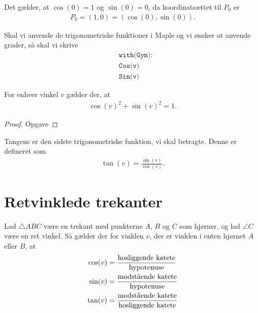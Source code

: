 \begin{exa}
Det gælder, at $\cos(0) = 1$ og $\sin(0)=0$, da koordinatsættet til $P_0$ er 
\begin{align*}
P_0 = (1,0) = (\cos(0),\sin(0)).
\end{align*}
\end{exa}

Skal vi anvende de trigonometriske funktioner i Maple og vi ønsker at anvende grader, så skal vi skrive
\begin{align*}
	&\texttt{with(Gym):} \\
	&\texttt{Cos(v)} \\	
	&\texttt{Sin(v)}
\end{align*}

\begin{setn}[Idiotformlen]
For enhver vinkel $v$ gælder der, at 
\begin{align*}
 \cos(v)^2 + \sin(v)^2 = 1.
\end{align*}
\end{setn}
\begin{proof}
Opgave
\end{proof}

Tangens er den sidste trigonometriske funktion, vi skal betragte. Denne er defineret som 
\begin{align*}
\tan(v) = \frac{\sin(v)}{\cos(v)}.
\end{align*}

\newpage

\section*{Retvinklede trekanter}

\begin{setn}
Lad $\triangle ABC$ være en trekant med punkterne $A$,  $B$ og $C$ som hjørner, og lad $\angle C$ være en ret vinkel. Så gælder der for vinklen $v$, der er vinklen i enten hjørnet $A$ eller $B$, at 
\begin{align*}
\cos(v) &= \frac{\textnormal{hosliggende katete}}{\textnormal{hypotenuse}}\\
\sin(v) &= \frac{\textnormal{modstående katete}}{\textnormal{hypotenuse}}\\
\tan(v) &= \frac{\textnormal{modstående katete}}{\textnormal{hosliggende katete}}
\end{align*}
\end{setn}

\newpage 
